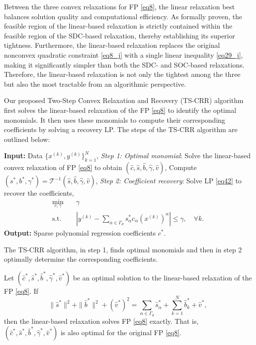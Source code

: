 \documentclass[smallextended,referee,envcountsect,,numbers]{svjour3}
\begin{document}
Between the three convex relaxations for FP \eqref{eq8}, the linear relaxation best balances solution quality and computational efficiency. As formally proven, the feasible region of the linear-based relaxation is strictly contained within the feasible region of the SDC-based relaxation, thereby establishing its superior tightness. Furthermore, the linear-based relaxation replaces the original nonconvex quadratic constraint \eqref{eq8_j} with a single linear inequality \eqref{eq29_j}, making it significantly simpler than both the SDC- and SOC-based relaxations. Therefore, the linear-based relaxation is not only the tightest among the three but also the most tractable from an algorithmic perspective. 

Our proposed Two-Step Convex Relaxation and Recovery (TS-CRR) algorithm first solves the linear-based relaxation of the FP \eqref{eq8} to identify the optimal monomials. It then uses these monomials to compute their corresponding coefficients by solving a recovery LP. The steps of the TS-CRR algorithm are outlined below:
\begin{algorithm}[H]
\caption{Two-Step Convex Relaxation and Recovery (TS-CRR)}
\begin{algorithmic}[1]
\State \textbf{Input:} Data $\{x^{(k)}, y^{(k)}\}_{k=1}^N$,
\State \textit{Step 1: Optimal monomial}: Solve the linear-based convex relaxation of FP \eqref{eq8} to obtain $\left(\hat{c},\hat{s},\hat{b},\hat{\gamma},\hat{v}\right)$,
\State Compute $\left(s^*,b^*,\gamma^*\right) = \mathcal{T}^{-1}(\hat{s},\hat{b},\hat{\gamma},\hat{v})$,
\State \textit{Step 2: Coefficient recovery}: Solve LP \eqref{eq42} to recover the coefficients,
\begin{subequations} \label{eq42}
\begin{align}
\min_{c,\gamma} \quad & \gamma \\
\text{s.t.} \quad & \left| y^{(k)} - \sum_{\alpha \in \Gamma_d} s^*_\alpha c_\alpha (x^{(k)})^\alpha \right| \le \gamma, \quad \forall k.
\end{align}
\end{subequations} 
\State \textbf{Output:} Sparse polynomial regression coefficients $c^*$.
\end{algorithmic}
\end{algorithm}

The TS-CRR algorithm, in step 1, finds optimal monomials and then in step 2 optimally determine the corresponding coefficients. 

\begin{theorem} \label{thm:lp_exact}
Let \( (\hat{c}^*, \hat{s}^*, \hat{b}^*, \hat{\gamma}^*, \hat{v}^*) \) be an optimal solution to the linear-based relaxation of the FP \eqref{eq8}. If
\begin{equation} \label{eq:lp_exact_condition}
\|\hat{s}^*\|^2 + \|\hat{b}^*\|^2 + (\hat{v}^*)^2 = \sum_{\alpha \in \Gamma_d} \hat{s}_\alpha^* + \sum_{k=1}^N \hat{b}_k^* + \hat{v}^*,
\end{equation}
then the linear-based relaxation solves FP \eqref{eq8} exactly. That is, \( (\hat{c}^*, \hat{s}^*, \hat{b}^*, \hat{\gamma}^*, \hat{v}^*) \) is also optimal for the original FP \eqref{eq8}.
\end{theorem}
\end{document}
